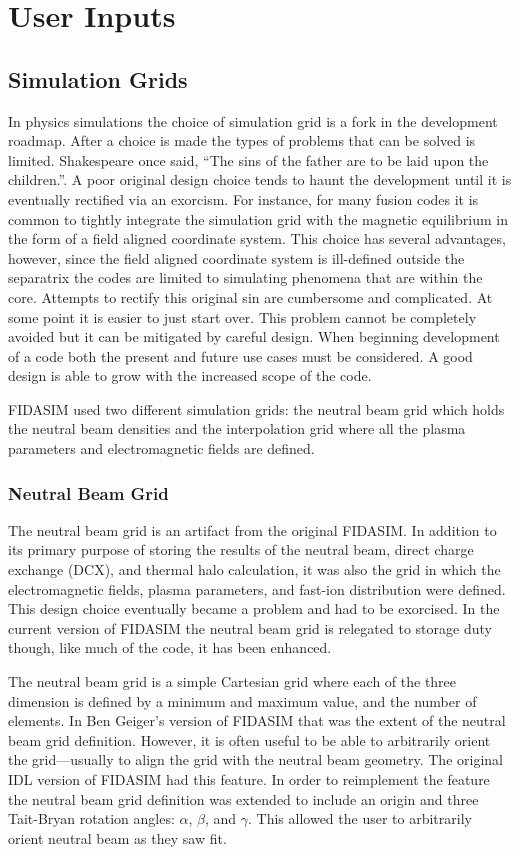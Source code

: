 \section{User Inputs}
\subsection{Simulation Grids}
In physics simulations the choice of simulation grid is a fork in the development roadmap. After a choice is made the types of problems that can be solved is limited. Shakespeare once said, “The sins of the father are to be laid upon the children.”. A poor original design choice tends to haunt the development until it is eventually rectified via an exorcism. For instance, for many fusion codes it is common to tightly integrate the simulation grid with the magnetic equilibrium in the form of a field aligned coordinate system. This choice has several advantages, however, since the field aligned coordinate system is ill-defined outside the separatrix the codes are limited to simulating phenomena that are within the core. Attempts to rectify this original sin are cumbersome and complicated. At some point it is easier to just start over. 
This problem cannot be completely avoided but it can be mitigated by careful design. When beginning development of a code both the present and future use cases must be considered. A good design is able to grow with the increased scope of the code.

FIDASIM used two different simulation grids: the neutral beam grid which holds the neutral beam densities and the interpolation grid where all the plasma parameters and electromagnetic fields are defined.
\subsubsection{Neutral Beam Grid}
The neutral beam grid is an artifact from the original FIDASIM. In addition to its primary purpose of storing the results of the neutral beam, direct charge exchange (DCX), and thermal halo calculation, it was also the grid in which the electromagnetic fields, plasma parameters, and fast-ion distribution were defined. This design choice eventually became a problem and had to be exorcised. In the current version of FIDASIM the neutral beam grid is relegated to storage duty though, like much of the code, it has been enhanced.

The neutral beam grid is a simple Cartesian grid where each of the three dimension is defined by a minimum and maximum value, and the number of elements. In Ben Geiger's version of FIDASIM that was the extent of the neutral beam grid definition. However, it is often useful to be able to arbitrarily orient the grid---usually to align the grid with the neutral beam geometry. The original IDL version of FIDASIM had this feature. In order to reimplement the feature the neutral beam grid definition was extended to include an origin and three Tait-Bryan rotation angles: $\alpha$, $\beta$, and $\gamma$. This allowed the user to arbitrarily orient neutral beam as they saw fit.

